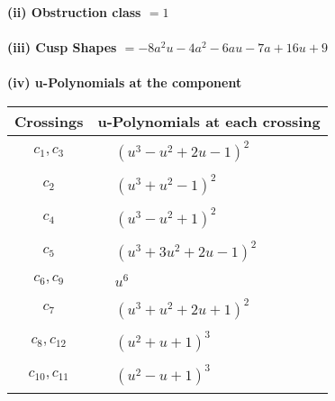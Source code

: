 \documentclass[1p]{elsarticle_modified}
\theoremstyle{definition}
\begin{document}
\flushleft \textbf{(ii) Obstruction class $= 1$}\\~\\
\flushleft \textbf{(iii) Cusp Shapes $= -8 a^2 u-4 a^2-6 a u-7 a+16 u+9$}\\~\\
\newpage\renewcommand{\arraystretch}{1}
\flushleft \textbf{(iv) u-Polynomials at the component}\newline \\
\begin{tabular}{m{50pt}|m{274pt}}
Crossings & \hspace{64pt}u-Polynomials at each crossing \\
\hline $$\begin{aligned}c_{1},c_{3}\end{aligned}$$&$\begin{aligned}
&(u^3- u^2+2 u-1)^2
\end{aligned}$\\
\hline $$\begin{aligned}c_{2}\end{aligned}$$&$\begin{aligned}
&(u^3+u^2-1)^2
\end{aligned}$\\
\hline $$\begin{aligned}c_{4}\end{aligned}$$&$\begin{aligned}
&(u^3- u^2+1)^2
\end{aligned}$\\
\hline $$\begin{aligned}c_{5}\end{aligned}$$&$\begin{aligned}
&(u^3+3 u^2+2 u-1)^2
\end{aligned}$\\
\hline $$\begin{aligned}c_{6},c_{9}\end{aligned}$$&$\begin{aligned}
&u^6
\end{aligned}$\\
\hline $$\begin{aligned}c_{7}\end{aligned}$$&$\begin{aligned}
&(u^3+u^2+2 u+1)^2
\end{aligned}$\\
\hline $$\begin{aligned}c_{8},c_{12}\end{aligned}$$&$\begin{aligned}
&(u^2+u+1)^3
\end{aligned}$\\
\hline $$\begin{aligned}c_{10},c_{11}\end{aligned}$$&$\begin{aligned}
&(u^2- u+1)^3
\end{aligned}$\\
\hline
\end{tabular}\\~\\
\end{document}
